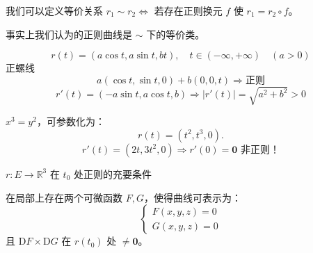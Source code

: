 \documentclass[lang=cn,10pt,thmcnt=section]{elegantbook}
\renewcommand{\vec}[1]{\mathbf{#1}}
\begin{document}
\begin{remark}
    我们可以定义等价关系 $r_1 \sim r_2 \Leftrightarrow$ 若存在正则换元 $f$ 使 $r_1 = r_2 \circ f$。

事实上我们认为的正则曲线是 $\sim$ 下的等价类。


\end{remark}

\begin{example}
\[
r(t) = (a\cos t, a\sin t, bt), \quad t \in (-\infty, +\infty) \quad (a > 0)
\]
正螺线
\[
a(\cos t, \sin t, 0) + b(0, 0, t) \Rightarrow \text{正则}
\]
\[
r'(t) = (-a\sin t, a\cos t, b) \Rightarrow |r'(t)| = \sqrt{a^2 + b^2} > 0
\]
\end{example}

\begin{example}
    $x^3 = y^2$，可参数化为：
\[
r(t) = (t^2, t^3, 0).
\]
\[
r'(t) = (2t, 3t^2, 0) \Rightarrow r'(0) = \vec{0} \text{ 非正则！}
\]
\end{example}
\begin{theorem}
    $r: E \rightarrow \mathbb{R}^3$ 在 $t_0$ 处正则的充要条件

在局部上存在两个可微函数 $F, G$，使得曲线可表示为：
\[
\begin{cases}
F(x, y, z) = 0 \\
G(x, y, z) = 0
\end{cases}
\]
且 $\text{D}F \times \text{D}G$ 在 $r(t_0)$ 处 $\neq \vec{0}$。
\end{theorem}
\end{document}

